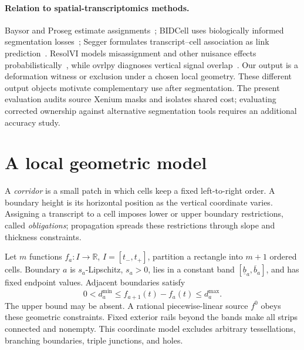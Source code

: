\documentclass[10pt,letterpaper]{article}
\newcommand{\R}{\mathbb R}
\begin{document}
\paragraph{Relation to spatial-transcriptomics methods.}
Baysor and Proseg estimate assignments~\cite{baysor,proseg}; BIDCell uses biologically informed segmentation losses~\cite{bidcell}; Segger formulates transcript--cell association as link prediction~\cite{segger}. ResolVI models misassignment and other nuisance effects probabilistically~\cite{resolvi}, while ovrlpy diagnoses vertical signal overlap~\cite{ovrlpy}. Our output is a deformation witness or exclusion under a chosen local geometry. These different output objects motivate complementary use after segmentation. The present evaluation audits source Xenium masks and isolates shared cost; evaluating corrected ownership against alternative segmentation tools requires an additional accuracy study.

\section{A local geometric model}\label{sec:model}
\noindent A \emph{corridor} is a small patch in which cells keep a fixed left-to-right order. A boundary height is its horizontal position as the vertical coordinate varies. Assigning a transcript to a cell imposes lower or upper boundary restrictions, called \emph{obligations}; propagation spreads these restrictions through slope and thickness constraints.\par
Let $m$ functions $f_a:I\to\R$, $I=[t_-,t_+]$, partition a rectangle into $m+1$ ordered cells. Boundary $a$ is $s_a$-Lipschitz, $s_a>0$, lies in a constant band $[\underline b_a,\overline b_a]$, and has fixed endpoint values. Adjacent boundaries satisfy
\begin{equation}
 0<d_a^{\min}\le f_{a+1}(t)-f_a(t)\le d_a^{\max}.\label{eq:gap}
\end{equation}
The upper bound may be absent. A rational piecewise-linear source $f^0$ obeys these geometric constraints. Fixed exterior rails beyond the bands make all strips connected and nonempty. This coordinate model excludes arbitrary tessellations, branching boundaries, triple junctions, and holes.
\end{document}
